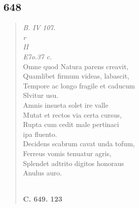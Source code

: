 \documentclass[11pt, a4paper]{report}
\begin{document}
            \subsection*{648}
      \begin{verse}
      \textit{B. IV 107.} \\ \textit{r} \\ \textit{II} \\ \textit{E7o.37 c.} \\ Omne quod Natura parens creavit, \\ Quamlibet firmum videas, labascit, \\ Tempore ac longo fragile et caducum \\ Slvitur usu. \\ Amnis insueta solet ire valle \\ Mutat et rectos via certa cursus, \\ Rupta cum cedit male pertinaci \\ ipa fluento. \\ Decidens scabrum cavat unda tofum, \\ Ferreus vomis tenuatur agris, \\ Splendet adtrito digitos honoraus \\ Anulus auro. \\ 
        ﻿\pagebreak 
    \begin{center} \textbf{C. 649. 123} \end{center} \marginpar{[117]} 
      \end{verse}
  
\end{document}
